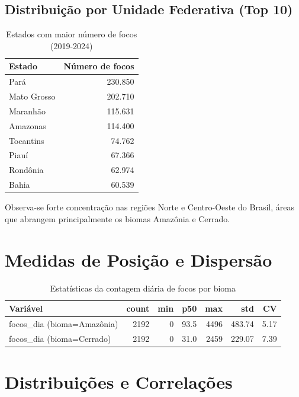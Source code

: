 \documentclass[12pt,a4paper]{report}
\begin{document}
\subsection{Distribuição por Unidade Federativa (Top 10)}

\begin{table}[h]
\centering
\caption{Estados com maior número de focos (2019-2024)}
\label{tab:top10_ufs}
\begin{tabular}{lr}
\toprule
\textbf{Estado} & \textbf{Número de focos} \\
\midrule
Pará & 230.850 \\
Mato Grosso & 202.710 \\
Maranhão & 115.631 \\
Amazonas & 114.400 \\
Tocantins & 74.762 \\
Piauí & 67.366 \\
Rondônia & 62.974 \\
Bahia & 60.539 \\
\bottomrule
\end{tabular}
\end{table}

\noindent Observa-se forte concentração nas regiões Norte e Centro-Oeste do Brasil, áreas que abrangem principalmente os biomas Amazônia e Cerrado.

\section{Medidas de Posição e Dispersão}
\begin{table}[h]
\centering
\caption{Estatísticas da contagem diária de focos por bioma}
\label{tab:stats}
\begin{tabular}{lrrrrrr}
\toprule
\textbf{Variável} & \textbf{count} & \textbf{min} & \textbf{p50} & \textbf{max} & \textbf{std} & \textbf{CV} \\
\midrule
focos\_dia (bioma=Amazônia) & 2192 & 0 & 93.5 & 4496 & 483.74 & 5.17 \\
focos\_dia (bioma=Cerrado)  & 2192 & 0 & 31.0 & 2459 & 229.07 & 7.39 \\
\bottomrule
\end{tabular}
\end{table}

\section{Distribuições e Correlações}
\end{document}

